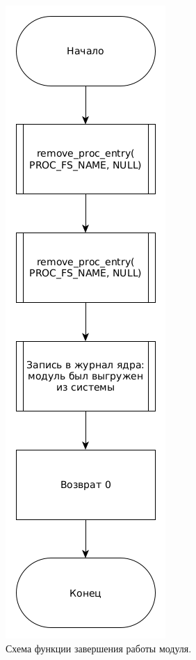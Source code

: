 \begin{figure}[H]
	\centering
	\includegraphics[scale=0.5]{img/exit.png}
	\caption{Схема функции завершения работы модуля.}
	\label{fig:exit}
\end{figure}

